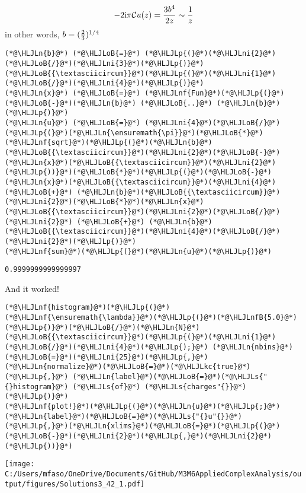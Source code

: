 \documentclass[12pt,a4paper]{article}
\newcommand{\HLJLkc}[1]{\textcolor[RGB]{59,151,46}{\textit{#1}}}
\newcommand{\HLJLn}[1]{#1}
\newcommand{\HLJLnf}[1]{\textcolor[RGB]{66,102,213}{#1}}
\newcommand{\HLJLs}[1]{\textcolor[RGB]{201,61,57}{#1}}
\newcommand{\HLJLnfB}[1]{\textcolor[RGB]{59,151,46}{#1}}
\newcommand{\HLJLni}[1]{\textcolor[RGB]{59,151,46}{#1}}
\newcommand{\HLJLoB}[1]{\textcolor[RGB]{102,102,102}{\textbf{#1}}}
\newcommand{\HLJLp}[1]{#1}
\def\I{ {\rm i} }
\def\CC{ {\cal C} }
\begin{document}
\[
-2\I\pi \CC u(z) = {3 b^4 \over 2 z} \sim {1 \over z}
\]
in other words, $b = ({2 \over 3})^{1/4}$


\begin{lstlisting}
(*@\HLJLn{b}@*) (*@\HLJLoB{=}@*) (*@\HLJLp{(}@*)(*@\HLJLni{2}@*)(*@\HLJLoB{/}@*)(*@\HLJLni{3}@*)(*@\HLJLp{)}@*)(*@\HLJLoB{{\textasciicircum}}@*)(*@\HLJLp{(}@*)(*@\HLJLni{1}@*)(*@\HLJLoB{/}@*)(*@\HLJLni{4}@*)(*@\HLJLp{)}@*)
(*@\HLJLn{x}@*) (*@\HLJLoB{=}@*) (*@\HLJLnf{Fun}@*)(*@\HLJLp{(}@*)(*@\HLJLoB{-}@*)(*@\HLJLn{b}@*) (*@\HLJLoB{..}@*) (*@\HLJLn{b}@*)(*@\HLJLp{)}@*)
(*@\HLJLn{u}@*) (*@\HLJLoB{=}@*) (*@\HLJLni{4}@*)(*@\HLJLoB{/}@*)(*@\HLJLp{(}@*)(*@\HLJLn{\ensuremath{\pi}}@*)(*@\HLJLoB{*}@*)(*@\HLJLnf{sqrt}@*)(*@\HLJLp{(}@*)(*@\HLJLn{b}@*)(*@\HLJLoB{{\textasciicircum}}@*)(*@\HLJLni{2}@*)(*@\HLJLoB{-}@*)(*@\HLJLn{x}@*)(*@\HLJLoB{{\textasciicircum}}@*)(*@\HLJLni{2}@*)(*@\HLJLp{))}@*)(*@\HLJLoB{*}@*)(*@\HLJLp{(}@*)(*@\HLJLoB{-}@*)(*@\HLJLn{x}@*)(*@\HLJLoB{{\textasciicircum}}@*)(*@\HLJLni{4}@*) (*@\HLJLoB{+}@*) (*@\HLJLn{b}@*)(*@\HLJLoB{{\textasciicircum}}@*)(*@\HLJLni{2}@*)(*@\HLJLoB{*}@*)(*@\HLJLn{x}@*)(*@\HLJLoB{{\textasciicircum}}@*)(*@\HLJLni{2}@*)(*@\HLJLoB{/}@*)(*@\HLJLni{2}@*) (*@\HLJLoB{+}@*) (*@\HLJLn{b}@*)(*@\HLJLoB{{\textasciicircum}}@*)(*@\HLJLni{4}@*)(*@\HLJLoB{/}@*)(*@\HLJLni{2}@*)(*@\HLJLp{)}@*)
(*@\HLJLnf{sum}@*)(*@\HLJLp{(}@*)(*@\HLJLn{u}@*)(*@\HLJLp{)}@*)
\end{lstlisting}

\begin{lstlisting}
0.9999999999999997
\end{lstlisting}


And it worked!


\begin{lstlisting}
(*@\HLJLnf{histogram}@*)(*@\HLJLp{(}@*)(*@\HLJLnf{\ensuremath{\lambda}}@*)(*@\HLJLp{(}@*)(*@\HLJLnfB{5.0}@*)(*@\HLJLp{)}@*)(*@\HLJLoB{/}@*)(*@\HLJLn{N}@*)(*@\HLJLoB{{\textasciicircum}}@*)(*@\HLJLp{(}@*)(*@\HLJLni{1}@*)(*@\HLJLoB{/}@*)(*@\HLJLni{4}@*)(*@\HLJLp{);}@*) (*@\HLJLn{nbins}@*)(*@\HLJLoB{=}@*)(*@\HLJLni{25}@*)(*@\HLJLp{,}@*) (*@\HLJLn{normalize}@*)(*@\HLJLoB{=}@*)(*@\HLJLkc{true}@*)(*@\HLJLp{,}@*) (*@\HLJLn{label}@*)(*@\HLJLoB{=}@*)(*@\HLJLs{"{}histogram}@*) (*@\HLJLs{of}@*) (*@\HLJLs{charges"{}}@*)(*@\HLJLp{)}@*)
(*@\HLJLnf{plot!}@*)(*@\HLJLp{(}@*)(*@\HLJLn{u}@*)(*@\HLJLp{;}@*) (*@\HLJLn{label}@*)(*@\HLJLoB{=}@*)(*@\HLJLs{"{}u"{}}@*)(*@\HLJLp{,}@*)(*@\HLJLn{xlims}@*)(*@\HLJLoB{=}@*)(*@\HLJLp{(}@*)(*@\HLJLoB{-}@*)(*@\HLJLni{2}@*)(*@\HLJLp{,}@*)(*@\HLJLni{2}@*)(*@\HLJLp{))}@*)
\end{lstlisting}

\texttt{[image: C:/Users/mfaso/OneDrive/Documents/GitHub/M3M6AppliedComplexAnalysis/output/figures/Solutions3\_42\_1.pdf]}
\end{document}
